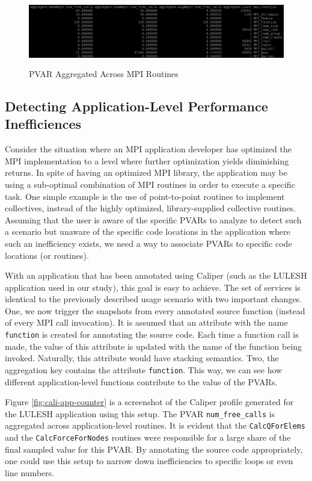 \begin{center}
	\begin{figure}[tbp!]
         \centering
  \captionsetup{justification=centering}
		\includegraphics[scale=0.8, width=\columnwidth, height=3cm]{figures/CALIPER_MPI_counter_PVAR}
		\caption{PVAR Aggregated Across MPI Routines}
		\label{fig:cali-counter}
	\end{figure}
\end{center}

\subsection{Detecting Application-Level Performance Inefficiences}
Consider the situation where an MPI application developer has optimized the MPI implementation to a level where further optimization yields diminishing returns. In spite of having an optimized MPI library, the application may be using a sub-optimal combination of MPI routines in order to execute a specific task. One simple example is the use of point-to-point routines to implement collectives, instead of the highly optimized, library-supplied collective routines. Assuming that the user is aware of the specific PVARs to analyze to detect such a scenario but unaware of the specific code locations in the application where such an inefficiency exists, we need a way to associate PVARs to specific code locations (or routines).
\par With an application that has been annotated using Caliper (such as the LULESH application used in our study), this goal is easy to achieve. The set of services is identical to the previously described usage scenario with two important changes. One, we now trigger the snapshots from every annotated source function (instead of every MPI call invocation). It is assumed that an attribute with the name \verb+function+ is created for annotating the source code. Each time a function call is made, the value of this attribute is updated with the name of the function being invoked. Naturally, this attribute would have stacking semantics. Two, the aggregation key contains the attribute \verb+function+. This way, we can see how different application-level functions contribute to the value of the PVARs. 
\par Figure \ref{fig:cali-app-counter} is a screenshot of the Caliper profile generated for the LULESH application using this setup. The PVAR \verb+num_free_calls+ is aggregated across application-level routines. It is evident that the \verb+CalcQForElems+ and the \verb+CalcForceForNodes+ routines were responsible for a large share of the final sampled value for this PVAR. By annotating the source code appropriately, one could use this setup to narrow down inefficiencies to specific loops or even line numbers.

